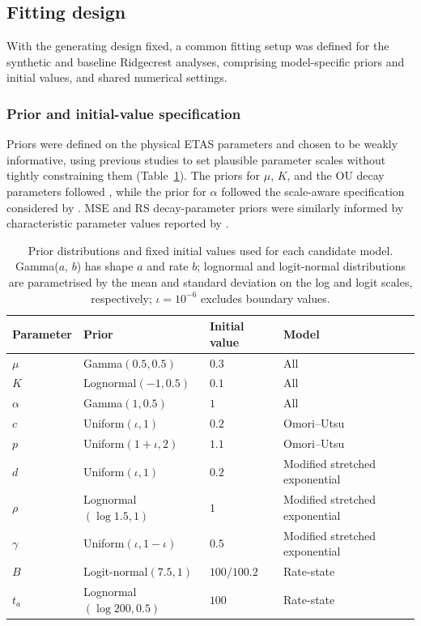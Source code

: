 \documentclass{statsmsc}
\begin{document}
\subsection{Fitting design}
With the generating design fixed, a common fitting setup was defined for the synthetic and baseline Ridgecrest analyses, comprising model-specific priors and initial values, and shared numerical settings.

\subsubsection{Prior and initial-value specification} \label{sec:priors}
Priors were defined on the physical ETAS parameters and chosen to be weakly informative, using previous studies to set plausible parameter scales without tightly constraining them (Table~\ref{tab:priors}). The priors for $\mu$, $K$, and the OU decay parameters followed \citet{naylor2023bayesian}, while the prior for $\alpha$ followed the scale-aware specification considered by \citet{serafini2023approximation}. MSE and RS decay-parameter priors were similarly informed by characteristic parameter values reported by \citet{hainzl2017testing}. 


\begin{table}[htbp]
\centering
\caption{Prior distributions and fixed initial values used for each candidate
model. Gamma($a$, $b$) has shape $a$ and rate $b$; lognormal and logit-normal distributions are parametrised by the mean and standard deviation
on the log and logit scales, respectively; $\iota=10^{-6}$ excludes boundary values.}
\label{tab:priors}
\begin{tabular}{llll}
\hline
Parameter & Prior & Initial value & Model \\
\hline
$\mu$     & Gamma$(0.5,0.5)$                    & $0.3$       & All \\
$K$       & Lognormal$(-1,0.5)$                 & $0.1$       & All \\
$\alpha$  & Gamma$(1,0.5)$ & $1$ & All \\
$c$       & Uniform$(\iota,1)$               & $0.2$       & Omori--Utsu \\
$p$       & Uniform$(1+\iota,2)$             & $1.1$       & Omori--Utsu \\
$d$       & Uniform$(\iota,1)$               & $0.2$       & Modified stretched exponential \\
$\rho$    & Lognormal$(\log 1.5,1)$             & $1$         & Modified stretched exponential \\
$\gamma$  & Uniform$(\iota,1-\iota)$      & $0.5$       & Modified stretched exponential \\
$B$       & Logit-normal$(7.5,1)$               & $100/100.2$ & Rate-state \\
$t_a$     & Lognormal$(\log 200,0.5)$           & $100$       & Rate-state \\
\hline
\end{tabular}
\end{table}
\end{document}
